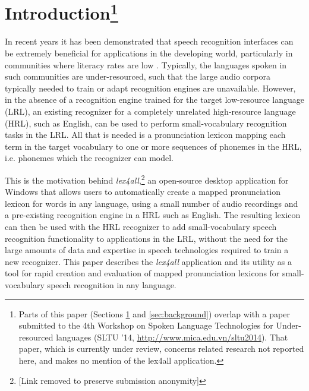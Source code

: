 \documentclass[11pt]{article}
\begin{document}
\section{Introduction\footnote{Parts of this paper (Sections \ref{sec:intro} and \ref{sec:background}) overlap with a paper submitted to the 4th Workshop on Spoken Language Technologies for Under-resourced languages (SLTU '14, \url{http://www.mica.edu.vn/sltu2014}). That paper, which is currently under review, concerns related research not reported here, and makes no mention of the lex4all application.}}
\label{sec:intro}

In recent years it has been demonstrated that speech recognition interfaces can be extremely beneficial for applications in the developing world, particularly in communities where literacy rates are low 
 \cite{case4st4d,bali13,Sherwani09}. 
Typically, the languages spoken in such communities are under-resourced, such that the large audio corpora typically needed to train or adapt recognition engines are unavailable.
However, in the absence of a recognition engine trained for the target low-resource language (LRL), an existing recognizer for a completely unrelated high-resource language (HRL), such as English, can be used to perform small-vocabulary recognition tasks in the LRL. 
All that is needed is a pronunciation lexicon mapping each term in the target vocabulary to one or more sequences of phonemes in the HRL, i.e. phonemes which the recognizer can model. 

This is the motivation behind \textit{lex4all},\footnote{[Link removed to preserve submission anonymity]} an open-source desktop application for Windows that allows users to automatically create a mapped pronunciation lexicon for words in any language, using a small number of audio recordings and a pre-existing recognition engine in a HRL such as English. The resulting lexicon can then be used with the HRL recognizer to add small-vocabulary speech recognition functionality to applications in the LRL, without the need for the large amounts of data and expertise in speech technologies required to train a new recognizer. This paper describes the \textit{lex4all} application and its utility as a tool for rapid
creation and evaluation of mapped pronunciation lexicons for small-vocabulary speech recognition in any language.
\end{document}
